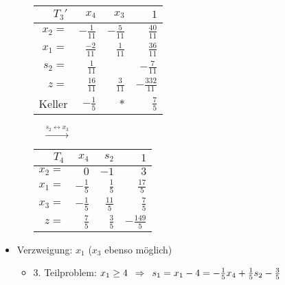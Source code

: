 \begin{beispiel}
\begin{itemize}[leftmargin=*]
\begin{itemize}
			\begin{center}
				\begin{tabular}{r|rr|r}
					$T_3'$ & $x_4$ & $x_3$ & $1$ \\ \hline
					$x_2 = $ & $-\frac{1}{11}$ & $-\frac{5}{11}$ & $\frac{40}{11}$ \\
					$x_1 = $ & $\frac{-2}{11}$ & $\frac{1}{11}$ & $\frac{36}{11}$ \\
					$s_2 = $ & $\frac{1}{11}$ & \fbox{$\frac{5}{11}$} & $-\frac{7}{11}$ \\ \hline
					$z = $   & $\frac{16}{11}$ & $\frac{3}{11}$ & $-\frac{332}{11}$ \\ \hline
					Keller & $-\frac{1}{5}$ & $\ast$ & $\frac{7}{5}$
				\end{tabular}	
				$\quad \overset{s_2 \leftrightarrow x_3}{\longrightarrow} \quad$		
				\begin{tabular}{r|rr|r}
					$T_4$ & $x_4$ & $s_2$ & $1$ \\ \hline
					$x_2 = $ & $0$ & $-1$ & $3$ \\
					$x_1 = $ & $-\frac{1}{5}$ & $\frac{1}{5}$ & $\frac{17}{5}$ \\
					$x_3 = $ & $-\frac{1}{5}$ & $\frac{11}{5}$ & $\frac{7}{5}$ \\ \hline
					$z = $   & $\frac{7}{5}$ & $\frac{3}{5}$ & $-\frac{149}{5}$
				\end{tabular}
			\end{center}
		\end{itemize}
		\item Verzweigung: $x_1$ ($x_3$ ebenso möglich)
		\begin{itemize}
			\item 3. Teilproblem: $x_1 \ge 4 \enskip \Rightarrow \enskip s_1 = x_1 - 4 = -\frac{1}{5}x_4 + \frac{1}{5} s_2 - \frac{3}{5}$
			

\end{itemize}
\end{itemize}
\end{beispiel}
